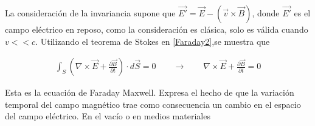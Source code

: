 La consideración de la invariancia supone que $\vec{E'} = \vec{E} -( \vec{v}\times \vec{B})$, donde $\vec{E'}$ es el campo eléctrico en reposo, como la consideración es clásica, solo es válida cuando $v << c$. Utilizando el teorema de Stokes \cite{Arfken} en \eqref{Faraday2},se muestra que 

\begin{eqnarray}
\label{FM}
    \int_{S}\left(\nabla \times \vec{E}+\frac{\partial\vec{B}}{\partial t}\right)\cdot d\vec{S} =0 \qquad \longrightarrow \qquad \boxed{\nabla \times \vec{E} + \frac{\partial \vec{B}}{\partial t} = 0}
\end{eqnarray}

Esta es la ecuación de Faraday Maxwell. Expresa el hecho de que la variación temporal del campo magnético trae como consecuencia un cambio en el espacio del campo eléctrico. En el vacío o en medios materiales

